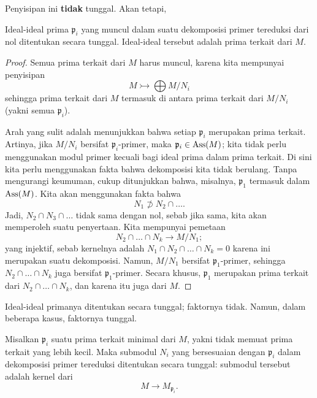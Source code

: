 Penyisipan ini \textbf{tidak} tunggal. Akan tetapi, 

\begin{proposition} 
Ideal-ideal prima $\mathfrak{p}_i$ yang muncul dalam suatu dekomposisi primer tereduksi dari nol
ditentukan secara tunggal. Ideal-ideal tersebut adalah prima terkait dari $M$.
\end{proposition} 
\begin{proof} 
Semua prima terkait dari $M$ harus muncul, karena kita mempunyai penyisipan
\[ M \rightarrowtail  \bigoplus M/N_i  \]
sehingga prima terkait dari $M$ termasuk di antara prima terkait dari $M/N_i$ (yakni semua
$\mathfrak{p}_i$).

Arah yang sulit adalah menunjukkan bahwa setiap $\mathfrak{p}_i$ merupakan prima terkait.
Artinya, jika $M/N_i$ bersifat $\mathfrak{p}_i$-primer, maka $\mathfrak{p}_i \in \operatorname{Ass}(M)$;
kita tidak perlu menggunakan modul primer kecuali bagi ideal prima dalam prima terkait. 
Di sini kita perlu menggunakan fakta bahwa dekomposisi kita tidak berulang. Tanpa
mengurangi keumuman, cukup ditunjukkan bahwa, misalnya, $\mathfrak{p}_1$
termasuk dalam $\operatorname{Ass}(M)$. Kita akan menggunakan fakta bahwa
\[ N_1 \not\supset N_2 \cap \dots .  \]
Jadi, $N_2 \cap N_3 \cap \dots$ tidak sama dengan nol, sebab jika sama,
kita akan memperoleh suatu penyertaan. Kita mempunyai pemetaan
\[ N_2 \cap \dots \cap N_k \to M/N_1;  \]
yang injektif, sebab kernelnya adalah $N_1 \cap N_2 \cap \dots \cap N_k = 0$ karena
ini merupakan suatu dekomposisi.
Namun, $M/N_1$ bersifat $\mathfrak{p}_1$-primer, sehingga $N_2 \cap \dots \cap N_k$ juga
bersifat $\mathfrak{p}_1$-primer. Secara khusus, $\mathfrak{p}_1$ merupakan prima terkait
dari $N_2 \cap \dots \cap N_k$, dan karena itu juga dari $M$.
\end{proof} 

Ideal-ideal primanya ditentukan secara tunggal; faktornya tidak. Namun, dalam beberapa kasus, faktornya tunggal.

\begin{proposition} 
Misalkan $\mathfrak{p}_i$ suatu prima terkait minimal dari $M$, yakni tidak memuat
prima terkait yang lebih kecil. Maka submodul $N_i$ yang bersesuaian dengan
$\mathfrak{p}_i$ dalam dekomposisi primer tereduksi ditentukan secara tunggal:
submodul tersebut adalah kernel dari 
\[ M \to M_{\mathfrak{p}_i}.  \]
\end{proposition} 

